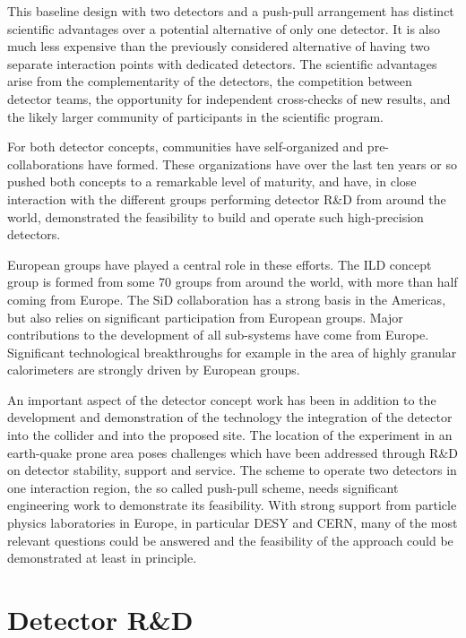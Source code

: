 \documentclass[%
 reprint,
 amsmath,amssymb,
 aps,
]{revtex4-1}
\begin{document}
This baseline design with two detectors and a push-pull arrangement has distinct scientific advantages over a potential alternative of only one detector. It is also much less expensive than the previously considered alternative of having two separate interaction points with dedicated detectors. The scientific advantages arise from the complementarity of the detectors, the competition between detector teams, the opportunity for independent cross-checks of new results, and the likely larger community of participants in the scientific program. 

For both detector concepts, communities have self-organized and pre-collaborations have formed. These organizations have over the last ten years or so pushed both concepts to a remarkable level of maturity, and have, in close interaction with the different groups performing detector R\&D from around the world, demonstrated the feasibility to build and operate such high-precision detectors. 

European groups have played a central role in these efforts. The ILD concept group is formed from some 70 groups from around the world, with more than half coming from Europe. The SiD collaboration has a strong basis in the Americas, but also relies on significant participation from European groups. Major contributions to the development of all sub-systems have come from Europe. Significant technological breakthroughs for example in the area of highly granular calorimeters are strongly driven by European groups. 

An important aspect of the detector concept work has been in addition to the development and demonstration of the technology the integration of the detector into the collider and into the proposed site. The location of the experiment in an earth-quake prone area poses challenges which have been addressed through R\&D on detector stability, support and service. The scheme to operate two detectors in one interaction region, the so called push-pull scheme, needs significant engineering work to demonstrate its feasibility. With strong support from particle physics laboratories in Europe, in  particular DESY and CERN, many of the most relevant questions could be answered and the feasibility of the approach could be demonstrated at least in principle. 




\section{\label{sec:detectrd} Detector R\&D}
\end{document}
